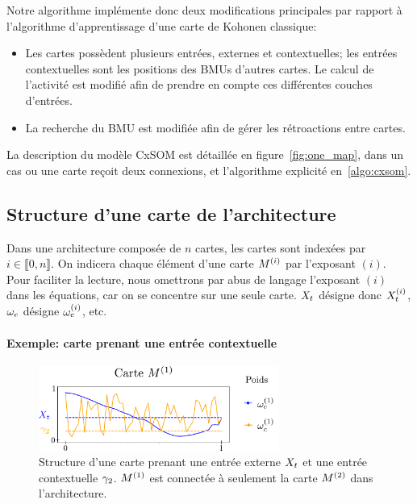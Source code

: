 Notre algorithme implémente donc deux modifications principales par rapport à l'algorithme d'apprentissage d'une carte de Kohonen classique: 
\begin{itemize}
\item Les cartes possèdent plusieurs entrées, externes et contextuelles; les entrées contextuelles sont les positions des BMUs d'autres cartes. Le calcul de l'activité est modifié afin de prendre en compte ces différentes couches d'entrées.
\item La recherche du BMU est modifiée afin de gérer les rétroactions entre cartes.
\end{itemize}

La description du modèle CxSOM est détaillée en figure~\ref{fig:one_map}, dans un cas ou une carte reçoit deux connexions, et l'algorithme explicité en~\ref{algo:cxsom}.

\subsection{Structure d'une carte de l'architecture}

Dans une architecture composée de $n$ cartes, les cartes sont indexées par $i \in \llbracket 0,n \rrbracket$. On indicera chaque élément d'une carte $M^{({i})}$ par l'exposant $(i)$. Pour faciliter la lecture, nous omettrons par abus de langage l'exposant $(i)$ dans les équations, car on se concentre sur une seule carte. $X_t$ désigne donc $X_t^{({i})}$, $\omega_e$ désigne $\omega_e^{({i})}$, etc.

\paragraph{Exemple: carte prenant une entrée contextuelle}

\begin{figure}
\centering
\includegraphics[width=0.7\textwidth]{weights_2som.pdf}
\caption{Structure d'une carte prenant une entrée externe $X_t$ et une entrée contextuelle $\gamma_2$. $M^{({1})}$ est connectée à seulement la carte $M^{({2})}$ dans l'architecture. }
\end{figure}


